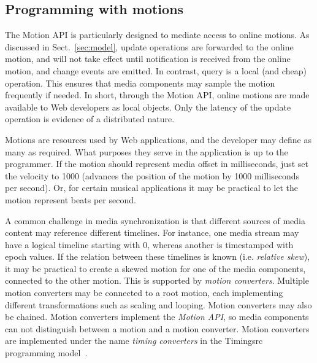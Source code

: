 \subsection{Programming with motions}


The Motion API is particularly designed to mediate access to online motions.
As discussed in Sect.~\ref{sec:model}, update operations are forwarded to the
online motion, and will not take effect until notification is received from
the online motion, and change events are emitted. In contrast, query is a local
(and cheap) operation. This ensures that media components may sample the
motion frequently if needed. In short, through the Motion API, online motions
are made available to Web developers as local objects. Only the latency of the
update operation is evidence of a distributed nature.


Motions are resources used by Web applications, and the developer may define
as many as required. What purposes they serve in the application is up to the
programmer. If the motion should represent media offset in milliseconds, just
set the velocity to 1000 (advances the position of the motion by 1000
milliseconds per second). Or, for certain musical applications it may be
practical to let the motion represent beats per second.


A common challenge in media synchronization is that different sources of media
content may reference different timelines. For instance, one media stream may
have a logical timeline starting with 0, whereas another is timestamped with
epoch values. If the relation between these timelines is known (i.e. \emph{relative
skew}), it may be practical to create a skewed motion for one of the media
components, connected to the other motion. This is supported by \emph{motion
converters}. Multiple motion converters may be connected to a root motion, each
implementing different transformations such as scaling and looping. Motion
converters may also be chained. Motion converters implement the \emph{Motion API},
so media components can not distinguish between a motion and a motion
converter. Motion converters are implemented under the name \emph{timing converters}
in the Timingsrc programming model~\cite{timingsrc}.

\label{sec:toomuch}

